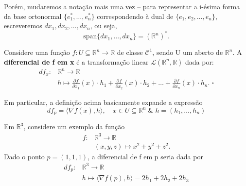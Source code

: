 \documentclass[../differential_forms.tex]{subfiles}
\begin{document}
Porém, mudaremos a notação mais uma vez -- para representar a i-ésima forma da base ortonormal \(\{e_{1}^{*}, \dotsc , e_{n}^{*}\}\) correspondendo à dual de
\(\{e_{1}, e_{2}, \dotsc , e_{n}\}\), escreveremos \(dx_1, dx_2, \dotsc , dx_{n}\), ou seja,
\[
	\mathrm{span}\{dx_1, \dotsc , dx_{n}\} = (\mathbb{R}^{n})^{*}.
\]
\begin{def*}
	Considere uma função \(f:U\subseteq \mathbb{R}^{n}\rightarrow \mathbb{R}\) de classe \(\mathcal{C}^{1}\), sendo U um aberto de
	\(\mathbb{R}^{n}\). A \textbf{diferencial de f em x} é a transformação linear \(\mathcal{L}(\mathbb{R}^{n}, \mathbb{R})\) dada por:
	\begin{align*}
		df_x: & \mathbb{R}^{n}\rightarrow\mathbb{R}                                                                                                                                                         \\
		      & h\longmapsto \frac{\partial^{}f}{\partial x_1^{}}(x)\cdot h_1 + \frac{\partial^{}f}{\partial x_2^{}}(x)\cdot h_2 + \dotsc + \frac{\partial^{}f}{\partial x_{n}^{}}(x)\cdot h_{n}.\; \square
	\end{align*}
\end{def*}
Em particular, a definição acima basicamente expande a expressão
\[
	df_p = \langle \nabla f(x), h \rangle,\quad x\in U\subseteq \mathbb{R}^{n}\;\&\; h = (h_1, \dotsc , h_{n})
\]
\begin{example}
	Em \(\mathbb{R}^{3}\), considere um exemplo da função
	\begin{align*}
		f: & \mathbb{R}^{3}\rightarrow\mathbb{R}         \\
		   & (x, y, z)\longmapsto x^{2} + y^{2} + z^{2}.
	\end{align*}
	Dado o ponto \(p = (1, 1, 1)\), a diferencial de f em p seria dada por
	\[
		\begin{align*}
			df_p: & \mathbb{R}^{3}\rightarrow\mathbb{R}                              \\
			      & h\longmapsto \langle \nabla f(p), h \rangle = 2h_1 + 2h_2 + 2h_3
		\end{align*}
	\]
\end{example}
\end{document}
